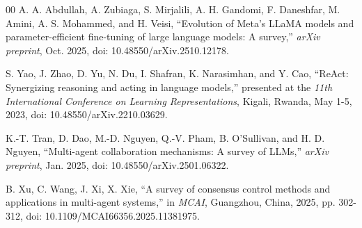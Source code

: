 \documentclass[journal,twoside,web]{ieeecolor_no_firstpage_logo}
\begin{document}
\begin{thebibliography}{00}
 A. A. Abdullah, A. Zubiaga, S. Mirjalili, A. H. Gandomi, F. Daneshfar, M. Amini, A. S. Mohammed, and H. Veisi, “Evolution of Meta’s LLaMA models and parameter-efficient fine-tuning of large language models: A survey,” \textit{arXiv preprint}, Oct. 2025, doi: 10.48550/arXiv.2510.12178.





 S. Yao, J. Zhao, D. Yu, N. Du, I. Shafran, K. Narasimhan, and Y. Cao, “ReAct: Synergizing reasoning and acting in language models,” presented at the \textit{11th International Conference on Learning Representations}, Kigali, Rwanda, May 1-5, 2023, doi: 10.48550/arXiv.2210.03629.

 K.-T. Tran, D. Dao, M.-D. Nguyen, Q.-V. Pham, B. O’Sullivan, and H. D. Nguyen, “Multi-agent collaboration mechanisms: A survey of LLMs,” \textit{arXiv preprint}, Jan. 2025, doi: 10.48550/arXiv.2501.06322.


 B. Xu, C. Wang, J. Xi, X. Xie,  “A survey of consensus control methods and applications in multi-agent systems,” in \textit{MCAI}, Guangzhou, China, 2025, pp. 302-312, doi: 10.1109/MCAI66356.2025.11381975.


\end{thebibliography}
\end{document}
